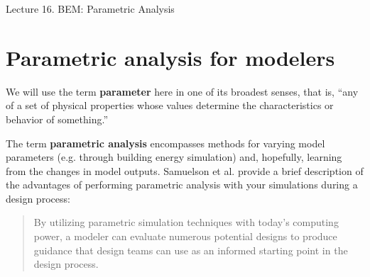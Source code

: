 \documentclass[10pt]{article}
\begin{document}
   \noindent
   \begin{center}

   \hrulefill
   
   \vspace{5pt}
   
   \vspace{0pt}
   
   {\Large \hfill  Lecture 16. BEM: Parametric Analysis}
   \vspace{5pt}
   
  
   \hrulefill
   \end{center}

   {}

\vspace{-2pt}

\section{Parametric analysis for modelers}

We will use the term \textbf{parameter} here in one of its broadest senses, that is, ``any of a set of physical properties whose values determine the characteristics or behavior of something.'' \cite{noauthor_undated-uq}

    
The term \textbf{parametric analysis} encompasses methods for varying model parameters (e.g. through building energy simulation) and, hopefully, learning from the changes in model outputs. Samuelson et al. \cite{Samuelson2016-xw} provide a brief description of the advantages of performing parametric analysis with your simulations during a design process:

\begin{quote}
By utilizing
parametric simulation techniques with today's computing power, a modeler can evaluate numerous potential designs to produce guidance that design teams can use as an informed starting point in the design process. \cite{Samuelson2016-xw}
\end{quote}
\end{document}
